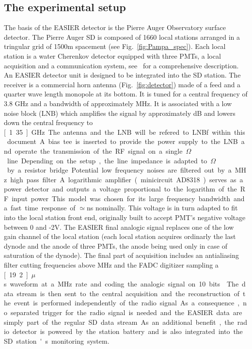 \subsection{The experimental setup}  
The basis of the EASIER detector is the  Pierre Auger  Observatory surface  detector. The Pierre Auger SD is  composed  of 1660 local stations arranged  in a tringular grid of  1500m spacement (see Fig.~\ref{fig:Pampa_spec}). Each local station is a water  Cherenkov detector equipped with three PMTs, a       local        acquisition       and       a       communication system, see~\cite{augerdetector} for a comprehensive description. An EASIER detector unit is designed to be integrated  into the  SD station.
 The receiver is a commercial horn antenna (Fig.~\ref{fig:detector}) made
 of a  feed and a  quarter wave length  monopole at its bottom.   It is
 tuned  for  a  central  frequency  of  3.8  GHz  and  a  bandwidth  of
 approximately \unit[500 to 800]{MHz}.  It  is associated with a low  noise block (LNB)  which amplifies  the signal by approximately  \unit[60]{dB} and lowers
 down the  central frequency to  \unit[1.35]{GHz}. The antenna and the LNB will be refered to LNBf within this document. A bias  tee is  inserted to provide  the power  supply to the  LNB and operate   the   transmission   of   the   RF  signal   on   a   single \unit[75]{$\Omega$} line.  Depending on  the setup, the line impedance  is adapted to \unit[50]{$\Omega$} by a resistor bridge.
 Potential low  frequency noises are filtered out  by a \unit[900]{MHz}
 high pass filter.  A logarithmic amplifier (minicircuit AD8318) serves
 as  a power  detector and outputs  a voltage  proportional to  the
 logarithm of the RF input power.   This model was chosen for its large
 frequency  bandwidth and  a fast  time response  of $\simeq$\unit[tens
   of]{ns} nominally.  This voltage is  in turn adapted to fit into  the local station  front  end, originally built to accept  PMT's negative voltage between 0 and
  -2V.  The EASIER  final analogic signal replaces one  of the low gain
  channel of  the local station (each local  station acquires ordinarly
  the last  dynode and the  anode of three  PMTs, the anode  being used
  only  in  case of  saturation  of the  dynode).   The  final part  of
  acquisition includes an antialiasing filter cutting frequencies above
  \unit[20]{MHz} and the FADC digitizer sampling a \unit[19.2]{$\mu$ s}
  waveform at a  \unit[40]{MHz} rate and coding the  analogic signal on
  10 bits~\cite{augertechnical}.   The data stream is then  sent to the
  central acquisition and the  reconstruction of the event is performed
  independently of the radio signal. As a consequence, no separated trigger for the radio signal is needed and the EASIER data are simply part of the regular SD data stream.  As  an additional benefit, the radio detector
is  powered by the  station battery  and is  also integrated  into the SD station's monitoring  system. 

